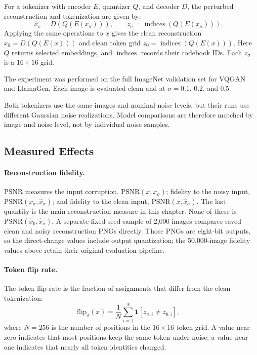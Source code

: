 For a tokenizer with encoder $E$, quantizer $Q$, and decoder $D$, the perturbed
reconstruction and tokenization are given by:
\begin{equation}
    \hat{x}_{\sigma} = D(Q(E(x_{\sigma}))),
    \qquad
    z_{\sigma} = \operatorname{indices}(Q(E(x_{\sigma}))).
    \label{eq:rq2_reconstruction_tokenization}
\end{equation}
Applying the same operations to $x$ gives the clean reconstruction
$\hat{x}_0=D(Q(E(x)))$ and clean token grid
$z_0=\operatorname{indices}(Q(E(x)))$. Here $Q$ returns selected embeddings,
and $\operatorname{indices}$ records their codebook IDs. Each $z_{\sigma}$ is
a $16\times16$ grid.

The experiment was performed on the full ImageNet validation set for VQGAN and
LlamaGen. Each image is evaluated clean and at $\sigma=0.1$, $0.2$, and $0.5$.

Both tokenizers use the same images and nominal noise levels, but their runs use
different Gaussian noise realizations. Model comparisons are therefore matched
by image and noise level, not by individual noise samples.

\subsection{Measured Effects}
\label{subsec:rq2_metrics}

\paragraph{Reconstruction fidelity.}
PSNR measures the input corruption, $\mathrm{PSNR}(x,x_{\sigma})$; fidelity to
the noisy input, $\mathrm{PSNR}(x_{\sigma},\hat{x}_{\sigma})$; and fidelity to
the clean input, $\mathrm{PSNR}(x,\hat{x}_{\sigma})$. The last quantity is the
main reconstruction measure in this chapter. None of these is
$\mathrm{PSNR}(\hat{x}_0,\hat{x}_{\sigma})$. A separate fixed-seed sample of
2{,}000 images compares saved clean and noisy reconstruction PNGs directly.
Those PNGs are eight-bit outputs, so the direct-change values include output
quantization; the 50{,}000-image fidelity values above retain their original
evaluation pipeline.

\paragraph{Token flip rate.}
The token flip rate is the fraction of assignments that differ from the clean
tokenization:
\begin{equation}
    \mathrm{flip}_{\sigma}(x)
    =
    \frac{1}{N}
    \sum_{i=1}^{N}
    \mathbf{1}\!\left[z_{\sigma,i} \neq z_{0,i}\right],
    \label{eq:rq2_token_flip}
\end{equation}
where $N=256$ is the number of positions in the $16 \times 16$ token grid. A value near zero indicates that most positions keep the same token under noise; a value near one indicates that nearly all token identities changed.


